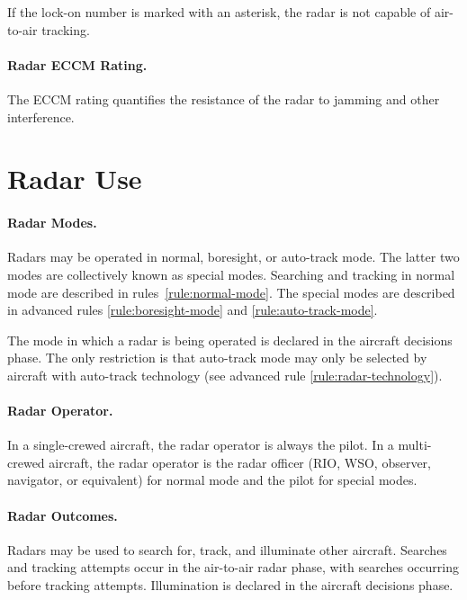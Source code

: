 {If the lock-on number is marked with an asterisk, the radar is not capable of air-to-air tracking.

\paragraph{Radar ECCM Rating.} The ECCM rating quantifies the resistance of the radar to jamming and other interference.

\section{Radar Use}
\label{rule:radar-use}

\paragraph{Radar Modes.} Radars may be operated in normal, boresight, or auto-track mode. The latter two modes are collectively known as special modes. Searching and tracking in normal mode are described in rules~\ref{rule:normal-mode}. The special modes are described in advanced rules \ref{rule:boresight-mode} and \ref{rule:auto-track-mode}. 


The mode in which a radar is being operated is declared in the aircraft decisions phase. The only restriction is that auto-track mode may only be selected by aircraft with auto-track technology (see advanced rule \ref{rule:radar-technology}).

\paragraph{Radar Operator.} In a single-crewed aircraft, the radar operator is always the pilot. In a multi-crewed aircraft, the radar operator is the radar officer (RIO, WSO, observer, navigator, or equivalent) for normal mode and the pilot for special modes.

\paragraph{Radar Outcomes.}

Radars may be used to search for, track, and illuminate other aircraft. Searches and tracking attempts occur in the air-to-air radar phase, with searches occurring before tracking attempts. Illumination is declared in the aircraft decisions phase.

}
